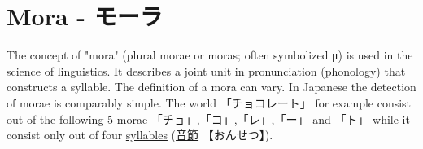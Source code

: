 \section{Mora - モーラ} \label{sec:Mora}

The concept of "mora"  (plural morae or moras; often symbolized μ) is used in
the science of linguistics. It describes a joint unit in pronunciation
(phonology) that constructs a syllable. The definition of a mora can vary.  In
Japanese the detection of morae is comparably simple. The world
{「チョコレート」} for example consist out of the following 5 morae
{「チョ」},{「コ」},{「レ」},{「ー」} and {「ト」} while it consist only out of
four \hyperref[sec:Syllable]{syllables} {(\hyperref[sec:Syllable]{音節}
【おんせつ】)}.

